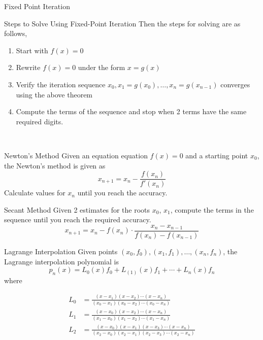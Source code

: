 \documentclass{article}
\begin{document}
\begin{multicols*}{3}
\begin{blackbox}{Fixed Point Iteration}
\begin{redbox}{Steps to Solve Using Fixed-Point Iteration}
            Then the steps for solving are as follows,
            \begin{enumerate}[leftmargin=8pt]
                \item Start with $f(x) = 0$
                \item Rewrite $f(x) = 0$ under the form $x = g(x)$
                \item Verify the iteration sequence $x_0, x_1 = g(x_0), \ldots, x_n = g(x_{n-1})$ converges using the above theorem 
                \item Compute the terms of the sequence and stop when 2 terms have the same required digits.
            \end{enumerate}
        \end{redbox}\\[-2ex]
    \end{blackbox}
    \begin{blackbox}{Newton's Method}
        Given an equation equation $f(x) = 0$ and a starting point $x_0$, the Newton's method is given as\\[-2ex]
        \[x_{n+1} = x_n - \frac{f(x_n)}{f'(x_n)}\]
        \vspace{-1ex}
        Calculate values for $x_n$ until you reach the accuracy.\\
    \end{blackbox}
    \begin{blackbox}{Secant Method}
        Given 2 estimates for the roots $x_0$, $x_1$, compute the terms in the sequence until you reach the required accuracy.\\[-2ex]
        \[x_{n+1} = x_n - f(x_n)\cdot \frac{x_n - x_{n-1}}{f(x_n) - f(x_{n-1})}\]
        \vspace{-2.5ex}
    \end{blackbox}
    \begin{blackbox}{Lagrange Interpolation}
        Given points $(x_0, f_0), (x_1, f_1), \ldots, (x_n, f_n)$, the Lagrange interpolation polynomial is \\[-2ex]
        \[p_n(x) = L_0(x)f_0 + L_(1)(x)f_1 + \cdots + L_n(x)f_n\]
        where \\[-5ex]
        {\footnotesize
        \begin{align*}
            L_0 &= \frac{(x-x_1)(x-x_2)\cdots(x-x_n)}{(x_0-x_1)(x_0-x_2)\cdots(x_0-x_n)}  \\
            L_1 &= \frac{(x-x_0)(x-x_2)\cdots(x-x_n)}{(x_1-x_0)(x_1-x_2)\cdots(x_1-x_n)}\\
            L_2 &= \frac{(x-x_0)(x-x_1)(x-x_3)\cdots(x-x_n)}{(x_2-x_0)(x_2-x_1)(x_2-x_3)\cdots(x_2-x_n)}
        \end{align*}
        
}
\end{blackbox}
\end{multicols*}
\end{document}
